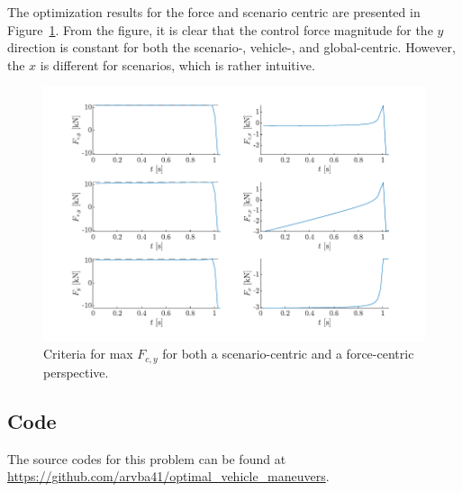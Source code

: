 The optimization results for the force and scenario centric are presented in Figure~\ref{fig:prob5_res}. From the figure, it is clear that the control force magnitude for the $y$ direction is constant for both the scenario-, vehicle-, and global-centric. However, the $x$ is different for scenarios, which is rather intuitive.

\vspace{5pt}
\noindent{}

\begin{figure}[h!]
    \centering
    \includegraphics{figures/prob5_opt_avoid_controlforce.pdf}
    \caption{Criteria for max $F_{c,y}$ for both a scenario-centric and a force-centric perspective.}
    \label{fig:prob5_res}
\end{figure}

\subsection{Code}
The source codes for this problem can be found at \newline \href{https://github.com/arvba41/optimal_vehicle_maneuvers/blob/main/uppgift/ugf4/opti_veh_men_prt.m}{https://github.com/arvba41/optimal\_vehicle\_maneuvers}.